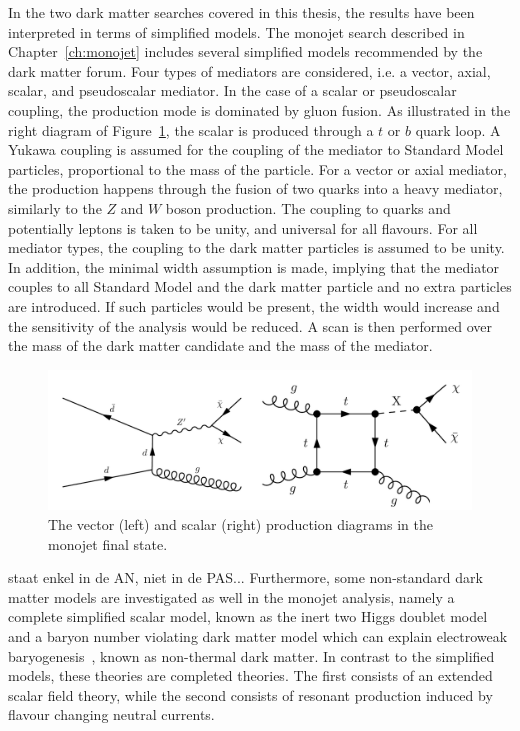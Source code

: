 In the two dark matter searches covered in this thesis, the results have been interpreted in terms of simplified models. The monojet search described in Chapter~\ref{ch:monojet} includes several simplified models recommended by the dark matter forum. Four types of mediators are considered, i.e. a vector, axial, scalar, and pseudoscalar mediator. In the case of a scalar or pseudoscalar coupling, the production mode is dominated by gluon fusion. As illustrated in the right diagram of Figure~\ref{fig:monojet_diagrams}, the scalar is produced through a $t$ or $b$ quark loop. A Yukawa coupling is assumed for the coupling of the mediator to Standard Model particles, proportional to the mass of the particle. For a vector or axial mediator, the production happens through the fusion of two quarks into a heavy mediator, similarly to the $Z$ and $W$ boson production. The coupling to quarks and potentially leptons is taken to be unity, and universal for all flavours. For all mediator types, the coupling to the dark matter particles is assumed to be unity. In addition, the minimal width assumption is made, implying that the mediator couples to all Standard Model and the dark matter particle and no extra particles are introduced. If such particles would be present, the width would increase and the sensitivity of the analysis would be reduced. A scan is then performed over the mass of the dark matter candidate and the mass of the mediator.

\begin{figure}[ht]
  \centering
 \includegraphics[width=.9\textwidth]{monojet_simplifiedmodel.png} 
 \caption{The vector (left) and scalar (right) production diagrams in the monojet final state.}
 \label{fig:monojet_diagrams}
\end{figure}

{\color{red} staat enkel in de AN, niet in de PAS...} Furthermore, some non-standard dark matter models are investigated as well in the monojet analysis, namely a complete simplified scalar model, known as the inert two Higgs doublet model and a baryon number violating dark matter model which can explain electroweak baryogenesis~\cite{Goudelis:2013uca,Dutta:2014kia}, known as non-thermal dark matter. In contrast to the simplified models, these theories are completed theories. The first consists of an extended scalar field theory, while the second consists of resonant production induced by flavour changing neutral currents.

